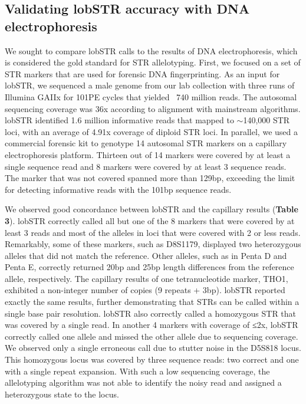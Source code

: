 \subsection{Validating lobSTR accuracy with DNA electrophoresis}
We sought to compare lobSTR calls to the results of DNA electrophoresis, which is considered the gold standard for STR allelotyping. First, we focused on a set of STR markers that are used for forensic DNA fingerprinting. As an input for lobSTR, we sequenced a male genome from our lab collection with three runs of Illumina GAIIx for 101PE cycles that yielded ~740 million reads. The autosomal sequencing coverage was 36x according to alignment with mainstream algorithms. lobSTR identified 1.6 million informative reads that mapped to $\sim$140,000 STR loci, with an average of 4.91x coverage of diploid STR loci. In parallel, we used a commercial forensic kit to genotype 14 autosomal STR markers on a capillary electrophoresis platform. Thirteen out of 14 markers were covered by at least a single sequence read and 8 markers were covered by at least 3 sequence reads. The marker that was not covered spanned more than 129bp, exceeding the limit for detecting informative reads with the 101bp sequence reads.

We observed good concordance between lobSTR and the capillary results (\textbf{Table 3}). lobSTR correctly called all but one of the 8 markers that were covered by at least 3 reads and most of the alleles in loci that were covered with 2 or less reads. Remarkably, some of these markers, such as D8S1179, displayed two heterozygous alleles that did not match the reference. Other alleles, such as in Penta D and Penta E, correctly returned 20bp and 25bp length differences from the reference allele, respectively. The capillary results of one tetranucleotide marker, THO1, exhibited a non-integer number of copies (9 repeats + 3bp). lobSTR reported exactly the same results, further demonstrating that STRs can be called within a single base pair resolution. lobSTR also correctly called a homozygous STR that was covered by a single read. In another 4 markers with coverage of ≤2x, lobSTR correctly called one allele and missed the other allele due to sequencing coverage. We observed only a single erroneous call due to stutter noise in the D5S818 locus. This homozygous locus was covered by three sequence reads: two correct and one with a single repeat expansion. With such a low sequencing coverage, the allelotyping algorithm was not able to identify the noisy read and assigned a heterozygous state to the locus. 

